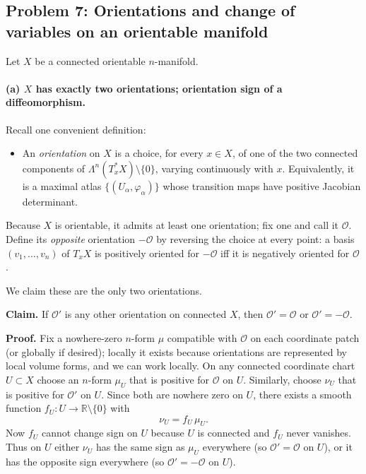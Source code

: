 \documentclass[12pt,a4paper]{article}
\theoremstyle{plain}
\theoremstyle{definition}      %
\begin{document}
	
	\subsection*{Problem 7: Orientations and change of variables on an orientable manifold}
	
	\noindent
	Let $X$ be a connected orientable $n$-manifold.
	
	\paragraph{(a) $X$ has exactly two orientations; orientation sign of a diffeomorphism.}
	
	\noindent
	Recall one convenient definition:
	
	\begin{itemize}
		\item An \emph{orientation} on $X$ is a choice, for every $x\in X$, of one of the two connected components of
		$\Lambda^n(T_x^*X)\setminus\{0\}$, varying continuously with $x$. Equivalently, it is a maximal atlas
		$\{(U_\alpha,\varphi_\alpha)\}$ whose transition maps have positive Jacobian determinant.
	\end{itemize}
	
	\noindent
	Because $X$ is orientable, it admits at least one orientation; fix one and call it $\mathcal O$.
	Define its \emph{opposite} orientation $-\mathcal O$ by reversing the choice at every point:
	a basis $(v_1,\dots,v_n)$ of $T_xX$ is positively oriented for $-\mathcal O$ iff it is negatively oriented for $\mathcal O$.
	
	\medskip
	\noindent
	We claim these are the only two orientations.
	
	\medskip
	\noindent
	\textbf{Claim.} If $\mathcal O'$ is any other orientation on connected $X$, then $\mathcal O'=\mathcal O$ or
	$\mathcal O'=-\mathcal O$.
	
	\noindent
	\textbf{Proof.}
	Fix a nowhere-zero $n$-form $\mu$ compatible with $\mathcal O$ on each coordinate patch (or globally if desired);
	locally it exists because orientations are represented by local volume forms, and we can work locally.
	On any connected coordinate chart $U\subset X$ choose an $n$-form $\mu_U$ that is positive for $\mathcal O$ on $U$.
	Similarly, choose $\nu_U$ that is positive for $\mathcal O'$ on $U$.
	Since both are nowhere zero on $U$, there exists a smooth function $f_U:U\to\mathbb{R}\setminus\{0\}$ with
	\[
	\nu_U = f_U\,\mu_U.
	\]
	Now $f_U$ cannot change sign on $U$ because $U$ is connected and $f_U$ never vanishes.
	Thus on $U$ either $\nu_U$ has the same sign as $\mu_U$ everywhere (so $\mathcal O'=\mathcal O$ on $U$),
	or it has the opposite sign everywhere (so $\mathcal O'=-\mathcal O$ on $U$).
	
\end{document}
